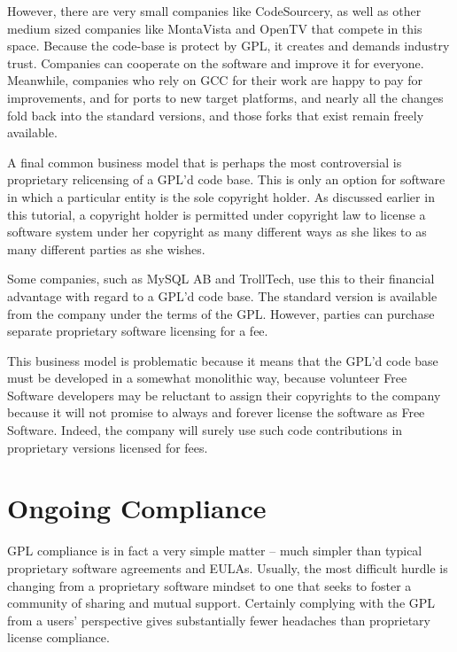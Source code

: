 \documentclass[12pt]{report}
\begin{document}
However, there are very small companies like CodeSourcery, as well as
other medium sized companies like MontaVista and OpenTV that compete in
this space.  Because the code-base is protect by GPL, it creates and
demands industry trust.  Companies can cooperate on the software and
improve it for everyone.  Meanwhile, companies who rely on GCC for their
work are happy to pay for improvements, and for ports to new target
platforms, and nearly all the changes fold back into the standard
versions, and those forks that exist remain freely available.

\medskip

\label{Proprietary Relicensing}

A final common business model that is perhaps the most controversial is
proprietary relicensing of a GPL'd code base.  This is only an option for
software in which a particular entity is the sole copyright holder.  As
discussed earlier in this tutorial, a copyright holder is permitted under
copyright law to license a software system under her copyright as many
different ways as she likes to as many different parties as she wishes.

Some companies, such as MySQL AB and TrollTech, use this to their
financial advantage with regard to a GPL'd code base.  The standard
version is available from the company under the terms of the GPL\@.
However, parties can purchase separate proprietary software licensing for
a fee.

This business model is problematic because it means that the GPL'd code
base must be developed in a somewhat monolithic way, because volunteer
Free Software developers may be reluctant to assign their copyrights to
the company because it will not promise to always and forever license the
software as Free Software.  Indeed, the company will surely use such code
contributions in proprietary versions licensed for fees.

\section{Ongoing Compliance}

GPL compliance is in fact a very simple matter -- much simpler than
typical proprietary software agreements and EULAs.  Usually, the most
difficult hurdle is changing from a proprietary software mindset to one
that seeks to foster a community of sharing and mutual support.  Certainly
complying with the GPL from a users' perspective gives substantially fewer
headaches than proprietary license compliance.
\end{document}
